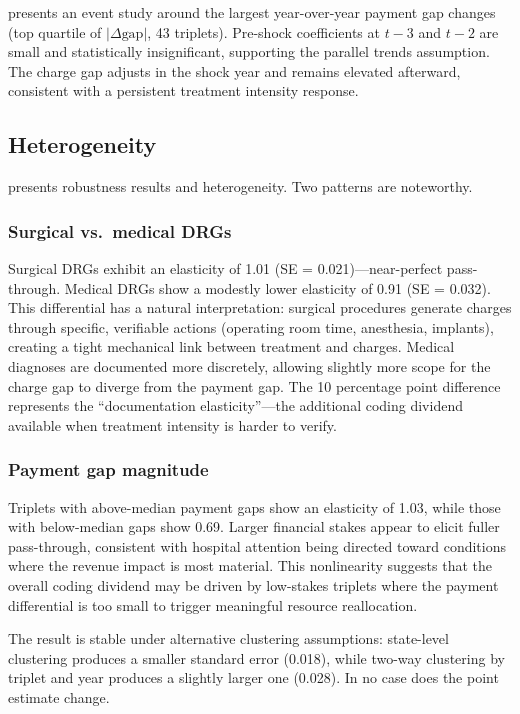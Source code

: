 \documentclass[12pt]{article}
\begin{document}
 presents an event study around the largest year-over-year payment gap changes (top quartile of $|\Delta\text{gap}|$, 43 triplets). Pre-shock coefficients at $t-3$ and $t-2$ are small and statistically insignificant, supporting the parallel trends assumption. The charge gap adjusts in the shock year and remains elevated afterward, consistent with a persistent treatment intensity response.

\subsection{Heterogeneity}



 presents robustness results and heterogeneity. Two patterns are noteworthy.

\subsubsection*{Surgical vs.\ medical DRGs} Surgical DRGs exhibit an elasticity of 1.01 (SE = 0.021)---near-perfect pass-through. Medical DRGs show a modestly lower elasticity of 0.91 (SE = 0.032). This differential has a natural interpretation: surgical procedures generate charges through specific, verifiable actions (operating room time, anesthesia, implants), creating a tight mechanical link between treatment and charges. Medical diagnoses are documented more discretely, allowing slightly more scope for the charge gap to diverge from the payment gap. The 10 percentage point difference represents the ``documentation elasticity''---the additional coding dividend available when treatment intensity is harder to verify.

\subsubsection*{Payment gap magnitude} Triplets with above-median payment gaps show an elasticity of 1.03, while those with below-median gaps show 0.69. Larger financial stakes appear to elicit fuller pass-through, consistent with hospital attention being directed toward conditions where the revenue impact is most material. This nonlinearity suggests that the overall coding dividend may be driven by low-stakes triplets where the payment differential is too small to trigger meaningful resource reallocation.

The result is stable under alternative clustering assumptions: state-level clustering produces a smaller standard error (0.018), while two-way clustering by triplet and year produces a slightly larger one (0.028). In no case does the point estimate change.
\end{document}
